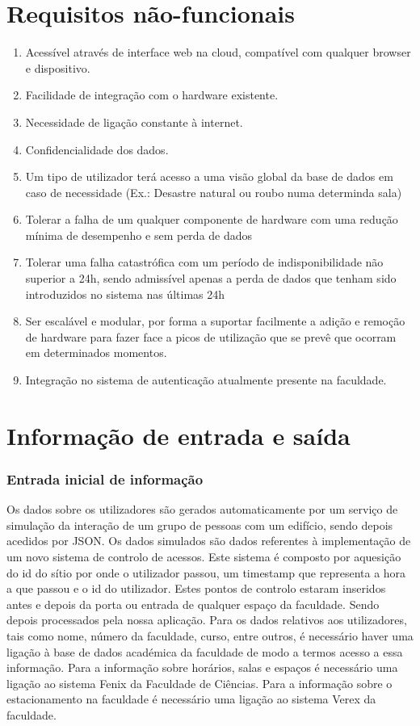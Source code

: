\documentclass[a4paper]{report}
\begin{document}
\section{Requisitos não-funcionais}
\begin{enumerate}
\item Acessível através de interface web na cloud, compatível com qualquer browser e dispositivo.
\item Facilidade de integração com o hardware existente.
\item Necessidade de ligação constante à internet.
\item Confidencialidade dos dados.
\item Um tipo de utilizador terá acesso a uma visão global da base de dados em caso de necessidade (Ex.: Desastre natural ou roubo numa determinda sala)
\item Tolerar a falha de um qualquer componente de hardware com uma redução mínima de desempenho e sem perda de dados
\item Tolerar uma falha catastrófica com um período de indisponibilidade não superior a 24h, sendo admissível apenas a perda de dados que tenham sido introduzidos no sistema nas últimas 24h
\item Ser escalável e modular, por forma a suportar facilmente a adição e remoção de hardware para fazer face a picos de utilização que se prevê que ocorram em determinados momentos.
\item Integração no sistema de autenticação atualmente presente na faculdade.
\end{enumerate}
\section{Informação de entrada e saída}
\subsubsection*{Entrada inicial de informação}
    Os dados sobre os utilizadores são gerados automaticamente por um serviço de simulação da interação de um grupo de pessoas com um edifício, sendo depois acedidos por JSON.
	Os dados simulados são dados referentes à implementação de um novo sistema de controlo de acessos. Este sistema é composto por aquesição do id do sítio por onde o utilizador passou, um timestamp que representa a hora a que passou e o id do utilizador. Estes pontos de controlo estaram inseridos antes e depois da porta ou entrada de qualquer espaço da faculdade. Sendo depois processados pela nossa aplicação. Para os dados relativos aos utilizadores, tais como nome, número da faculdade, curso, entre outros, é necessário haver uma ligação à base de dados académica da faculdade de modo a termos acesso a essa informação. Para a informação sobre horários, salas e espaços é necessário uma ligação ao sistema Fenix da Faculdade de Ciências. Para a informação sobre o estacionamento na faculdade é necessário uma ligação ao sistema Verex da faculdade.
\end{document}
